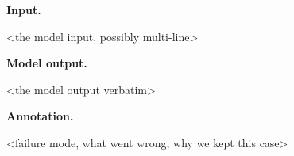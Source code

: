 \begin{RACaseBox}[title={Case Study: <Short Headline>}]
\textbf{Input.}\par
<the model input, possibly multi-line>

\par\medskip
\textbf{Model output.}\par
<the model output verbatim>

\par\medskip
\textbf{Annotation.}\par
<failure mode, what went wrong, why we kept this case>
\end{RACaseBox}
